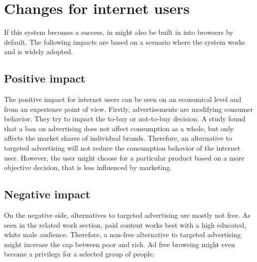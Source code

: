 \section{Changes for internet users}
If this system becomes a success, in might also be built in into browsers by default. The following impacts are based on a scenario where the system works and is widely adopted. 

\subsection{Positive impact}
The positive impact for internet users can be seen on an economical level and from an experience point of view. Firstly, advertisements are modifying consumer behavior. They try to impact the to-buy or not-to-buy decision\cite{johnson2007consumer}. A study found that a ban on advertising does not affect consumption as a whole, but only affects the market shares of individual brands\cite{advertisementsconsumption}. Therefore, an alternative to targeted advertising will not reduce the consumption behavior of the internet user. However, the user might choose for a particular product based on a more objective decision, that is less influenced by marketing.

\subsection{Negative impact}
On the negative side, alternatives to targeted advertising are mostly not free. As seen in the related work section, paid content works best with a high educated, white male audience. Therefore, a non-free alternative to targeted advertising might increase the cap between poor and rich. Ad free browsing might even become a privilege for a selected group of people.